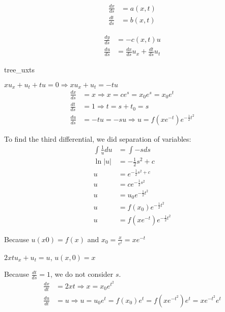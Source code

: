   \begin{multicols}{2}
    \begin{align}
      \frac{dx}{ds} & = a(x, t)\\
      \frac{dt}{ds} & = b(x, t)
    \end{align}

    \begin{align}
      \frac{dy}{ds} & = -c(x, t) u\\
      \frac{du}{ds} & = \frac{dx}{ds} u_x + \frac{dt}{ds} u_t
    \end{align}
  \end{multicols}

  \begin{center}
    {tree_uxts}
  \end{center}

  \ex $xu_x + u_t + tu = 0 \Rightarrow xu_x + u_t = -tu$
  \begin{align}
    \frac{dx}{ds} & = x \Rightarrow x = ce^s = x_0 e^s = x_0 e^t\\
    \frac{dt}{ds} & = 1 \Rightarrow t = s + t_0 = s\\
    \frac{du}{ds} & = -tu = -su \Rightarrow u = f\left(xe^{-t}\right)
    e^{-\frac{1}{2}t^2}
  \end{align}

  To find the third differential, we did separation of variables:
  \begin{align}
    \int \frac{1}{u} du & = \int -s ds\\
    \ln |u| & = - \frac{1}{2} s^2 + c\\
    u & = e^{- \frac{1}{2} s^2 + c}\\
    u & = ce^{- \frac{1}{2} s^2}\\
    u & = u_0 e^{-\frac{1}{2} t^2}\\
    u & = f(x_0) e^{-\frac{1}{2}t^2}\\
    u & = f\left(xe^{-t}\right)e^{-\frac{1}{2}t^2}
  \end{align}

  Because $u(x 0) = f(x)$ and $x_0 = \frac{x}{e^t} = xe^{-t}$

  \ex $2xtu_x + u_t = u$, $u(x, 0) = x$

  Because $\frac{dt}{ds} = 1$, we do not consider $s$.
  \begin{align}
    \frac{dx}{dt} & = 2xt \Rightarrow x = x_0 e^{t^2}\\
    \frac{du}{dt} & = u \Rightarrow u = u_0 e^t = f(x_0) e^t = f(xe^{-t^2})e^t
    = xe^{-t^2} e^t
  \end{align}

